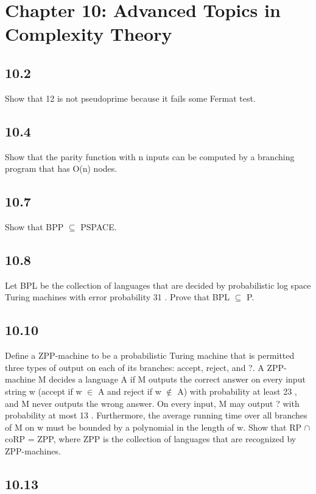 \section{Chapter 10: Advanced Topics in Complexity Theory}

\subsection*{10.2}

Show that 12 is not pseudoprime because it fails some Fermat test.


\subsection*{10.4}

Show that the parity function with n inputs can be computed by a branching program that has O(n) nodes.


\subsection*{10.7}

Show that BPP $\subseteq$ PSPACE.


\subsection*{10.8}

Let BPL be the collection of languages that are decided by probabilistic log space Turing machines with error probability 31 . Prove that BPL $\subseteq$ P.


\subsection*{10.10}

Define a ZPP-machine to be a probabilistic Turing machine that is permitted three types of output on each of its branches: accept, reject, and ?. A ZPP-machine M decides a language A if M outputs the correct answer on every input string w (accept if w $\in$ A and reject if w $\notin$ A) with probability at least 23 , and M never outputs the wrong answer. On every input, M may output ? with probability at most 13 . Furthermore, the average running time over all branches of M on w must be bounded by a polynomial in the length of w. Show that RP $\cap$ coRP = ZPP, where ZPP is the collection of languages that are recognized by ZPP-machines.


\subsection*{10.13}

